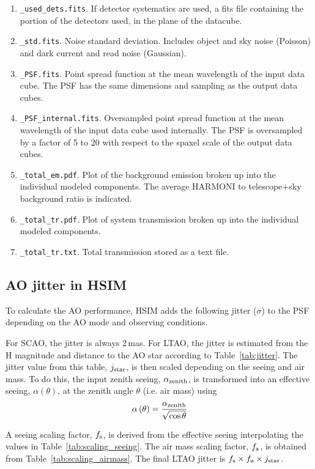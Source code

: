 \documentclass[12pt]{report}
\begin{document}
\begin{enumerate}
\item \texttt{\_used\_dets.fits}. If detector systematics are used, a fits file containing the portion of the detectors used, in the plane of the datacube.
\item \texttt{\_std.fits}. Noise standard deviation. Includes object and sky noise (Poisson) and dark current and read noise (Gaussian).
\item \texttt{\_PSF.fits}. Point spread function at the mean wavelength of the input data cube. The PSF has the same dimensions and sampling as the output data cubes.
\item \texttt{\_PSF\_internal.fits}. Oversampled point spread function at the mean wavelength of the input data cube used internally. The PSF is oversampled by a factor of 5 to 20 with respect to the spaxel scale of the output data cubes.
\item \texttt{\_total\_em.pdf}. Plot of the background emission broken up into the individual modeled components. The average HARMONI to telescope$+$sky background ratio is indicated.
\item \texttt{\_total\_tr.pdf}. Plot of system transmission broken up into the individual modeled components.
\item \texttt{\_total\_tr.txt}. Total transmission stored as a text file.

\end{enumerate}

\subsection{AO jitter in HSIM}

To calculate the AO performance, HSIM adds the following jitter ($\sigma$) to the PSF depending on the AO mode and observing conditions.

For SCAO, the jitter is always 2\,mas. For LTAO, the jitter is estimated from the H magnitude and distance to the AO star according to Table~\ref{tab:jitter}. The jitter value from this table, $j_{\rm star}$, is then scaled depending on the seeing and air mass.
To do this, the input zenith seeing, $\alpha_{\rm zenith}$, is transformed into an effective seeing, $\alpha\left(\theta\right)$, at the zenith angle $\theta$ (i.e. air mass) using
\begin{equation}
\alpha\left(\theta\right) = \frac{\alpha_{\rm zenith}}{\sqrt{\cos \theta}}
\end{equation}

A seeing scaling factor, $f_{\rm s}$, is derived from the effective seeing interpolating the values in Table~\ref{tab:scaling_seeing}. The air mass scaling factor, $f_{\rm a}$, is obtained from Table~\ref{tab:scaling_airmass}. The final LTAO jitter is $f_{\rm s} \times f_{\rm a} \times j_{\rm star}$.
\end{document}
